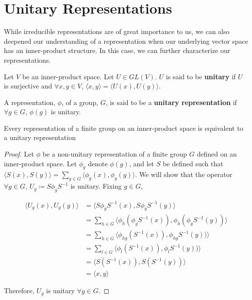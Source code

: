\section{Unitary Representations}

While irreducible representations are of great importance to us, we can also deepened our understanding of a representation when our underlying vector space has an inner-product structure. In this case, we can further characterize our representations. 

\begin{definition}
	Let $V$ be an inner-product space. Let $U \in GL(V)$. $U$ is said to be \textbf{unitary} if $U$ is surjective and $\forall x,y \in V$, $\langle x , y \rangle = \langle U(x) , U(y) \rangle$.
\end{definition}

\begin{definition}
	A representation, $\phi$, of a group, $G$, is said to be a \textbf{unitary representation} if $\forall g\in G$, $\phi(g)$ is unitary.
\end{definition}

\begin{theorem}
	Every representation of a finite group on an inner-product space is equivalent to a unitary representation
\end{theorem}

\begin{proof} Let $\phi$ be a non-unitary representation of a finite group $G$ defined on an inner-product space. Let $\phi_g$ denote $\phi(g)$, and let $S$ be defined such that $\langle S(x) , S(y) \rangle = \sum_{g \in G} \langle \phi_g (x) , \phi_g (y) \rangle$. We will show that the operator $\forall g \in G$, $U_g \coloneq S\phi_gS^{-1}$ is unitary. Fixing $g\in G$,


\begin{equation}
	\begin{aligned}
		\langle U_g(x) , U_g(y) \rangle &= \langle S\phi_gS^{-1}(x) , S\phi_gS^{-1}(y)\rangle \\
									&= \sum_{h \in G} \langle \phi_h(\phi_gS^{-1}(x)) , \phi_h(\phi_gS^{-1}(y))\rangle \\
									&= \sum_{h\in G} \langle \phi_{hg}(S^{-1}(x)) , \phi_{hg}S^{-1}(y))\rangle \\
									&= \sum_{l\in G} \langle \phi_{l}(S^{-1}(x)) , \phi_{l}S^{-1}(y))\rangle \\
									&= \langle S(S^{-1}(x)) , S(S^{-1}(y))\rangle \\
									&= \langle x , y \rangle 
	\end{aligned}
\end{equation}

Therefore, $U_g$ is unitary $\forall g \in G$. \end{proof}

